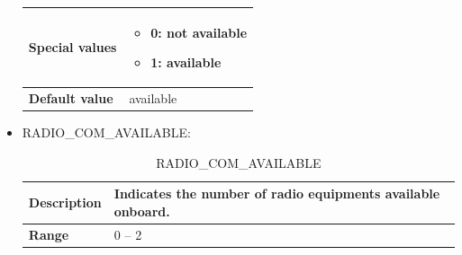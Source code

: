 \documentclass{template/openetcs}
\begin{document}
\begin{itemize}
\begin{longtable}{|l|l|}
				\hline
																																									
					\begin{minipage}[t]{0.22\linewidth} \textbf{Special values}	\end{minipage} 
				&	\begin{minipage}[t]{0.78\linewidth} \begin{itemize} \item 0: not available \item 1: available \end{itemize} \end{minipage} \\
				
				\hline
				
					\begin{minipage}[t]{0.22\linewidth} \textbf{Default value}	\end{minipage} 
				&	\begin{minipage}[t]{0.78\linewidth} available \end{minipage} \\
				
				\hline
				
			\end{longtable}
			
		\item RADIO\_COM\_AVAILABLE:
				
			\begin{longtable}{|l|l|}
				\caption{RADIO\_COM\_AVAILABLE}\\ 
				\hline
				
					\begin{minipage}[t]{0.22\linewidth} \textbf{Description}	\end{minipage} 
				&	\begin{minipage}[t]{0.78\linewidth} Indicates the number of radio equipments available onboard. \end{minipage} \\
				
				\hline
																																									
					\begin{minipage}[t]{0.22\linewidth} \textbf{Range}	\end{minipage} 
				&	\begin{minipage}[t]{0.78\linewidth} 0 – 2 \end{minipage} \\
				
				\hline
				

\end{longtable}
\end{itemize}
\end{document}
